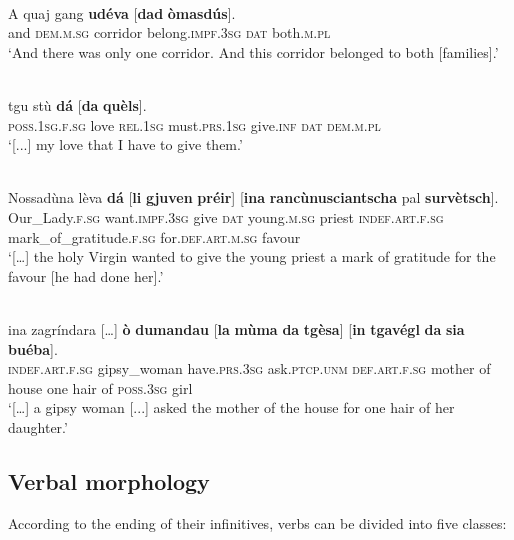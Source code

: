 \ea
\label{ex:trans:indir}
\\
\gll    A quaj gang \textbf{udéva} [\textbf{dad} \textbf{òmasdús}].\\
and \textsc{dem.m.sg} corridor belong.\textsc{impf.3sg} \textsc{dat} both.\textsc{m.pl}\\
\glt `And there was only one corridor. And this corridor belonged to both [families].'
\z

\ea
\label{ex:ditrans1}
\\
 tgu stù \textbf{dá} [\textbf{da} \textbf{quèls}].\\
{} \textsc{poss.1sg.f.sg} love \textsc{rel.1sg} must.\textsc{prs.1sg} give.\textsc{inf} \textsc{dat} \textsc{dem.m.pl}\\
\glt `[...] my love that I have to give them.'
\z

\ea\label{ex:ditrans2}
\\
\gll    […] Nossadùna lèva \textbf{dá} [\textbf{li} \textbf{gjuven} \textbf{préir}] [\textbf{ina} \textbf{rancùnusciantscha} pal \textbf{survètsch}].\\
   {}  Our\_Lady.\textsc{f.sg} want.\textsc{impf.3sg} give \textsc{dat} young.\textsc{m.sg} priest \textsc{indef.art.f.sg} mark\_of\_gratitude.\textsc{f.sg} for.\textsc{def.art.m.sg} favour \\
\glt `[…] the holy Virgin wanted to give the young priest a mark of gratitude for the favour [he had done her].'
\z

\ea
\label{ex:trans:2DO}
 {\citealt[131]{Büchli1966}}\\
\gll  [...]  ina zagríndara […] \textbf{ò} \textbf{dumandau} [\textbf{la} \textbf{mùma} \textbf{da} \textbf{tgèsa}] [\textbf{in} \textbf{tgavégl} \textbf{da} \textbf{sia} \textbf{buéba}]. \\
{} \textsc{indef.art.f.sg} gipsy\_woman {} have.\textsc{prs.3sg}   ask.\textsc{ptcp.unm} \textsc{def.art.f.sg} mother of house one hair of \textsc{poss.3sg} girl \\
\glt `[…] a gipsy woman [...] asked the mother of the house for one hair of her daughter.'
\z


\subsection{Verbal morphology}
According to the ending of their infinitives, verbs can be divided into five classes:

